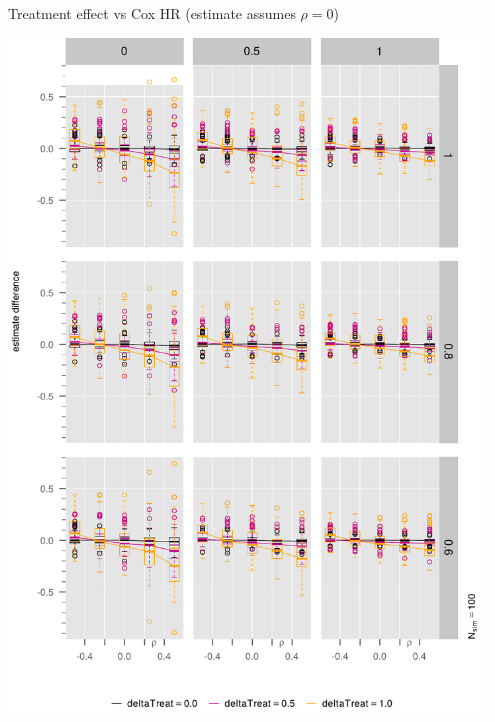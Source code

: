 \begin{frame}{Treatment effect vs Cox HR (estimate assumes $\rho=0$)}

\begin{center}
  \includegraphics[width=0.95\textwidth]{Figure3/estimateDifferences2v12.pdf}
\end{center}

\end{frame}

